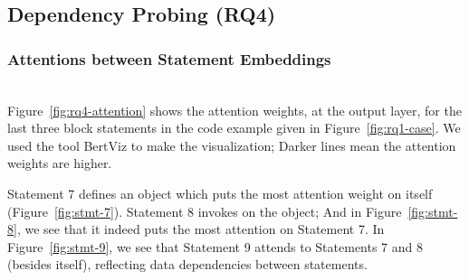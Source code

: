 \subsection{Dependency Probing (RQ4)}
\label{sec:rq4}


\subsubsection{Attentions between Statement Embeddings}~\\
Figure~\ref{fig:rq4-attention} shows the attention weights, at the output layer, for the last three  block statements in the code example given in Figure~\ref{fig:rq1-case}. We used the tool BertViz to make the visualization; Darker lines mean the attention weights are higher. 

Statement 7 defines an  object which puts the most attention weight on itself (Figure~\ref{fig:stmt-7}). Statement 8 invokes  on the  object; And in Figure~\ref{fig:stmt-8}, we see that it indeed puts the most attention on Statement 7. In Figure~\ref{fig:stmt-9}, we see that Statement 9 attends to Statements 7 and 8 (besides itself), reflecting data dependencies between statements.

